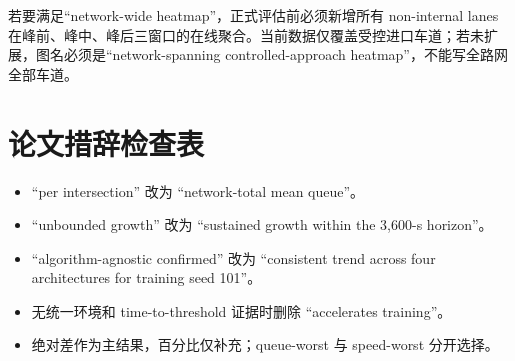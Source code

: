 若要满足“network-wide heatmap”，正式评估前必须新增所有 non-internal lanes 在峰前、峰中、峰后三窗口的在线聚合。当前数据仅覆盖受控进口车道；若未扩展，图名必须是“network-spanning controlled-approach heatmap”，不能写全路网全部车道。

\section{论文措辞检查表}
\begin{itemize}
  \item “per intersection” 改为 “network-total mean queue”。
  \item “unbounded growth” 改为 “sustained growth within the 3,600-s horizon”。
  \item “algorithm-agnostic confirmed” 改为 “consistent trend across four architectures for training seed 101”。
  \item 无统一环境和 time-to-threshold 证据时删除 “accelerates training”。
  \item 绝对差作为主结果，百分比仅补充；queue-worst 与 speed-worst 分开选择。
\end{itemize}
